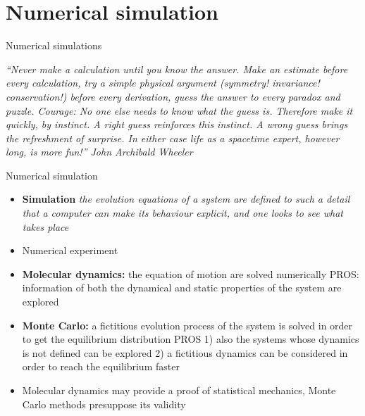 \documentclass{beamer}
\begin{document}
\section{Numerical simulation}

\begin{frame}{}
\begin{center}
{\Huge Numerical simulations}
\end{center}
\begin{center}
\textit{“Never make a calculation until you know the answer. Make an estimate before every calculation, try a simple physical argument (symmetry! invariance! conservation!) before every derivation, guess the answer to every paradox and puzzle. Courage: No one else needs to know what the guess is. Therefore make it quickly, by instinct. A right guess reinforces this instinct. A wrong guess brings the refreshment of surprise. In either case life as a spacetime expert, however long, is more fun!” John Archibald Wheeler }
\end{center}
\end{frame}


\begin{frame}{Numerical simulation \cite{peliti2011statistical}}
\begin{itemize}
\item \textbf{Simulation} \textit{the evolution equations of a system are defined to such a detail that a computer can make its behaviour explicit, and one looks to see what takes place} 
\item Numerical experiment 
\item \textbf{Molecular dynamics:} the equation of motion are solved numerically PROS: information of both the dynamical and static properties of the system are explored 
\item\textbf{Monte Carlo:} a fictitious evolution process of the system is solved in order to get the equilibrium distribution PROS  1) also the systems whose dynamics is not defined can be explored 2) a fictitious dynamics can be considered in order to reach the equilibrium faster 
\item Molecular dynamics may provide a proof of statistical mechanics, Monte Carlo methods presuppose its validity
\end{itemize}
\end{frame}
\end{document}
